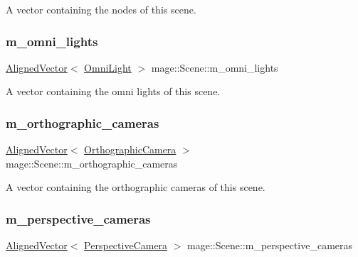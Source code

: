A vector containing the nodes of this scene. \hypertarget{classmage_1_1_scene_a2bb85a932e82a06824c7075fcc2d4644}{}\label{classmage_1_1_scene_a2bb85a932e82a06824c7075fcc2d4644} 
\subsubsection{\texorpdfstring{m\+\_\+omni\+\_\+lights}{m\_omni\_lights}}
{\footnotesize\ttfamily \hyperlink{namespacemage_a8664bfb5ce2179fc64eae9f82c8a5ba8}{Aligned\+Vector}$<$ \hyperlink{classmage_1_1_omni_light}{Omni\+Light} $>$ mage\+::\+Scene\+::m\+\_\+omni\+\_\+lights\hspace{0.3cm}{\ttfamily [private]}}

A vector containing the omni lights of this scene. \hypertarget{classmage_1_1_scene_a391e0e086241a4a8beb06f192ef3f1e8}{}\label{classmage_1_1_scene_a391e0e086241a4a8beb06f192ef3f1e8} 
\subsubsection{\texorpdfstring{m\+\_\+orthographic\+\_\+cameras}{m\_orthographic\_cameras}}
{\footnotesize\ttfamily \hyperlink{namespacemage_a8664bfb5ce2179fc64eae9f82c8a5ba8}{Aligned\+Vector}$<$ \hyperlink{classmage_1_1_orthographic_camera}{Orthographic\+Camera} $>$ mage\+::\+Scene\+::m\+\_\+orthographic\+\_\+cameras\hspace{0.3cm}{\ttfamily [private]}}

A vector containing the orthographic cameras of this scene. \hypertarget{classmage_1_1_scene_a73707ba421e5e1a74d1dd67679a0659a}{}\label{classmage_1_1_scene_a73707ba421e5e1a74d1dd67679a0659a} 
\subsubsection{\texorpdfstring{m\+\_\+perspective\+\_\+cameras}{m\_perspective\_cameras}}
{\footnotesize\ttfamily \hyperlink{namespacemage_a8664bfb5ce2179fc64eae9f82c8a5ba8}{Aligned\+Vector}$<$ \hyperlink{classmage_1_1_perspective_camera}{Perspective\+Camera} $>$ mage\+::\+Scene\+::m\+\_\+perspective\+\_\+cameras\hspace{0.3cm}{\ttfamily [private]}}

